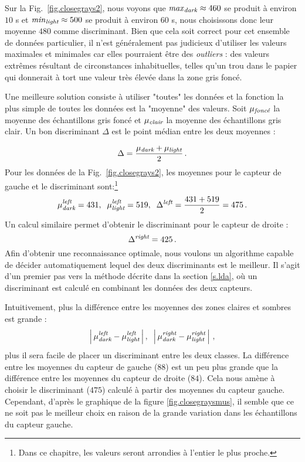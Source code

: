 Sur la Fig.~\ref{fig.closegrays2}, nous voyons que $\mathit{max}_{\textit{\scriptsize dark}}\approx 460$ se produit à environ $10$ s et $\mathit{min}_{\textit{\scriptsize light}}\approx 500$ se produit à environ $60$ s, nous choisissons donc leur moyenne $480$ comme discriminant. Bien que cela soit correct pour cet ensemble de données particulier, il n'est généralement pas judicieux d'utiliser les valeurs maximales et minimales car elles pourraient être des \emph{outliers} : des valeurs extrêmes résultant de circonstances inhabituelles, telles qu'un trou dans le papier qui donnerait à tort une valeur très élevée dans la zone gris foncé.

Une meilleure solution consiste à utiliser "toutes" les données et la fonction la plus simple de toutes les données est la "moyenne" des valeurs. Soit $\mu_{\textit{\scriptsize foncé}}$ la moyenne des échantillons gris foncé et $\mu_{\textit{\scriptsize clair}}$ la moyenne des échantillons gris clair. Un bon discriminant $\Delta$ est le point médian entre les deux moyennes :


\begin{displaymath}
\Delta = \frac{\mu_{\textit{\scriptsize dark}} + \mu_{\textit{\scriptsize light}}}{2}\,.
\end{displaymath}
Pour les données de la Fig.~\ref{fig.closegrays2}, les moyennes pour le capteur de gauche et le discriminant sont:\footnote{Dans ce chapitre, les valeurs seront arrondies à l'entier le plus proche.}
\[
\mu_{\textit{\scriptsize dark}}^{\textit{\scriptsize left}} = 431,\;\;
\mu_{\textit{\scriptsize light}}^{\textit{\scriptsize left}} = 519,\;\;
\Delta^{\textit{\scriptsize left}} = \frac{431+519}{2} = 475\,.
\]
Un calcul similaire permet d'obtenir le discriminant pour le capteur de droite :
\[
\Delta^{\textit{\scriptsize right}} = 425\,.
\]
Afin d'obtenir une reconnaissance optimale, nous voulons un algorithme capable de décider automatiquement lequel des deux discriminants est le meilleur. Il s'agit d'un premier pas vers la méthode décrite dans la section \ref{s.lda}, où un discriminant est calculé en combinant les données des deux capteurs.

Intuitivement, plus la différence entre les moyennes des zones claires et sombres est grande :
\[
\left|\,\mu_{\textit{\scriptsize dark}}^{\textit{\scriptsize left}} - \mu_{\textit{\scriptsize light}}^{\textit{\scriptsize left}}\,\right|,\;\;\left|\,\mu_{\textit{\scriptsize dark}}^{\textit{\scriptsize right}} - \mu_{\textit{\scriptsize light}}^{\textit{\scriptsize right}}\,\right|\,,
\]
plus il sera facile de placer un discriminant entre les deux classes. La différence entre les moyennes du capteur de gauche ($88$) est un peu plus grande que la différence entre les moyennes du capteur de droite ($84$). Cela nous amène à choisir le discriminant ($475$) calculé à partir des moyennes du capteur gauche. Cependant, d'après le graphique de la figure \ref{fig.closegraysmus}, il semble que ce ne soit pas le meilleur choix en raison de la grande variation dans les échantillons du capteur gauche.

